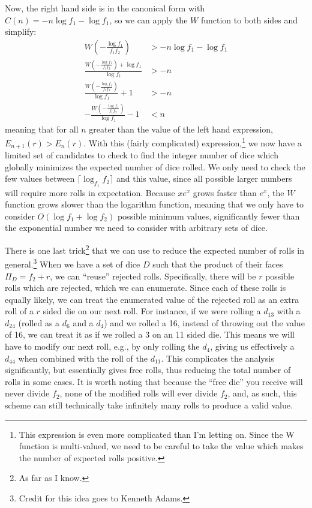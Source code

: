 \documentclass{article}
\begin{document}
Now, the right hand side is in the canonical form with $C(n) = -n\log{f_1}-\log{f_1}$, so we can apply the $W$ function to both sides and simplify:
\begin{align}
    W\left(-\frac{\log{f_1}}{f_1f_2}\right) &> -n\log{f_1}-\log{f_1}\\
    \frac{W\left(-\frac{\log{f_1}}{f_1f_2}\right) + \log{f_1}}{\log{f_1}} &> -n\\
    \frac{W\left(-\frac{\log{f_1}}{f_1f_2}\right)}{\log{f_1}} + 1 &> -n\\
    -\frac{W\left(-\frac{\log{f_1}}{f_1f_2}\right)}{\log{f_1}} - 1 &< n
\end{align}
meaning that for all $n$ greater than the value of the left hand expression, $E_{n+1}(r) > E_n(r)$.
With this (fairly complicated) expression,\footnote{This expression is even more complicated than I'm letting on. Since the W function is multi-valued, we need to be careful to take the value which makes the number of expected rolls positive.} we now have a limited set of candidates to check to find the integer number of dice which globally minimizes the expected number of dice rolled.
We only need to check the few values between $\lceil \log_{f_1}{f_2} \rceil$ and this value, since all possible larger numbers will require more rolls in expectation.
Because $xe^x$ grows faster than $e^x$, the $W$ function grows slower than the logarithm function, meaning that we only have to consider $O(\log{f_1} + \log{f_2})$ possible minimum values, significantly fewer than the exponential number we need to consider with arbitrary sets of dice.

\par There is one last trick\footnote{As far as I know.} that we can use to reduce the expected number of rolls in general.\footnote{Credit for this idea goes to Kenneth Adams.}
When we have a set of dice $D$ such that the product of their faces $\Pi_D = f_2 + r$, we can ``reuse'' rejected rolls.
Specifically, there will be $r$ possible rolls which are rejected, which we can enumerate.
Since each of these rolls is equally likely, we can treat the enumerated value of the rejected roll as an extra roll of a $r$ sided die on our next roll.
For instance, if we were rolling a $d_{13}$ with a $d_{24}$ (rolled as a $d_6$ and a $d_4$) and we rolled a 16, instead of throwing out the value of 16, we can treat it as if we rolled a 3 on an 11 sided die.
This means we will have to modify our next roll, e.g., by only rolling the $d_4$, giving us effectively a $d_{44}$ when combined with the roll of the $d_{11}$.
This complicates the analysis significantly, but essentially gives free rolls, thus reducing the total number of rolls in some cases.
It is worth noting that because the ``free die'' you receive will never divide $f_2$, none of the modified rolls will ever divide $f_2$, and, as such, this scheme can still technically take infinitely many rolls to produce a valid value.
\end{document}
